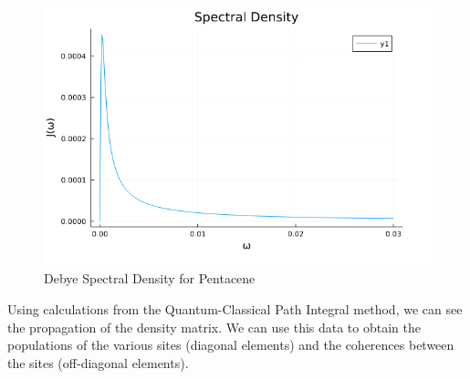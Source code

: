 \begin{figure}
    \centering
    \includegraphics[scale=0.3]{Figures/jw_pentacene.png}
    \caption{Debye Spectral Density for Pentacene}
\end{figure}

Using calculations from the Quantum-Classical Path Integral method, we can see the propagation of the density matrix. We can use this data to obtain the populations of the various sites (diagonal elements) and the coherences between the sites (off-diagonal elements).

